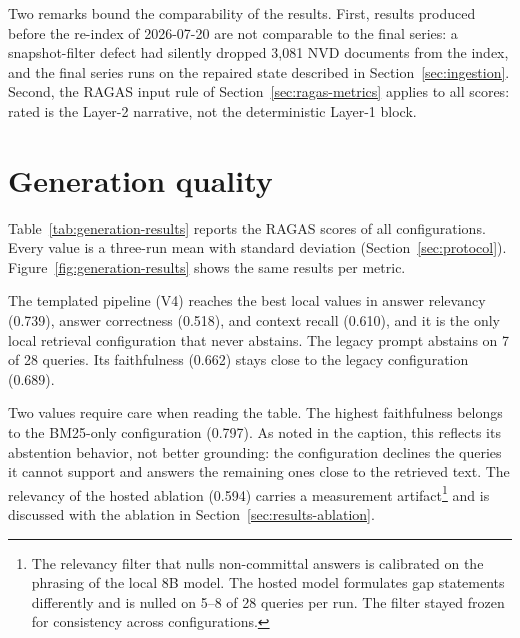 Two remarks bound the comparability of the results. First, results
produced before the re-index of 2026-07-20 are not comparable to the
final series: a snapshot-filter defect had silently dropped 3{,}081 NVD
documents from the index, and the final series runs on the repaired
state described in Section~\ref{sec:ingestion}. Second, the RAGAS input
rule of Section~\ref{sec:ragas-metrics} applies to all scores: rated is
the Layer-2 narrative, not the deterministic Layer-1 block.

\section{Generation quality}
\label{sec:results-generation}

Table~\ref{tab:generation-results} reports the RAGAS scores of all
configurations. Every value is a three-run mean with standard
deviation (Section~\ref{sec:protocol}).
Figure~\ref{fig:generation-results} shows the same results per metric.

\begin{table}[H]
    \centering
    \resizebox{\textwidth}{!}{}
    \caption{RAGAS results per pipeline (28 queries, judge gpt-4o-mini).
             The BM25-only faithfulness (0.797) is an abstention
             artifact (4--5 abstentions per run with conservative,
             extractive answers), not a grounding advantage.}
    \label{tab:generation-results}
\end{table}

The templated pipeline (V4) reaches the best local values in answer
relevancy (0.739), answer correctness (0.518), and context recall
(0.610), and it is the only local retrieval configuration that never
abstains. The legacy prompt abstains on 7 of 28 queries. Its faithfulness (0.662)
stays close to the legacy configuration (0.689).

Two values require care when reading the table. The highest faithfulness
belongs to the BM25-only configuration (0.797). As noted in the caption,
this reflects its abstention behavior, not better grounding: the
configuration declines the queries it cannot support and answers the
remaining ones close to the retrieved text. The relevancy of the hosted
ablation (0.594) carries a measurement artifact\footnote{The relevancy
filter that nulls non-committal answers is calibrated on the phrasing of
the local 8B model. The hosted model formulates gap statements
differently and is nulled on 5--8 of 28 queries per run. The filter
stayed frozen for consistency across configurations.} and is discussed with the ablation in
Section~\ref{sec:results-ablation}.

